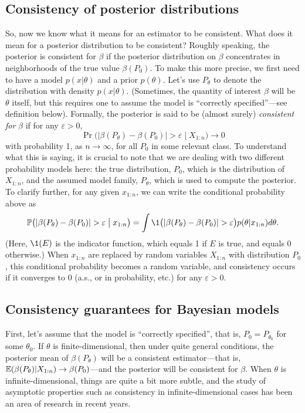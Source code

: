 \documentclass[12pt]{article}
\begin{document}
\subsection{Consistency of posterior distributions}

So, now we know what it means for an estimator to be consistent. What does it mean for a posterior distribution to be consistent? Roughly speaking, the posterior is consistent for $\beta$ if the posterior distribution on $\beta$ concentrates in neighborhoods of the true value $\beta(P_0)$.  
To make this more precise, we first need to have a model $p(x|\theta)$ and a prior $p(\theta)$. Let's use $P_\theta$ to denote the distribution with density $p(x|\theta)$. 
(Sometimes, the quantity of interest $\beta$ will be $\theta$ itself, but this requires one to assume the model is ``correctly specified''---see definition below).
Formally, the posterior is said to be (almost surely) \textit{consistent for} $\beta$ if for any $\varepsilon>0$, 
$$ \Pr\big(|\beta(P_\theta) - \beta(P_0)|>\varepsilon \; \big\vert \; X_{1:n}\big) \to 0 $$
with probability 1, as $n\to \infty$, for all $P_0$ in some relevant class. 
To understand what this is saying, it is crucial to note that we are dealing with two different probability models here: the true distribution, $P_0$, which is the distribution of $X_{1:n}$, and the assumed model family, $P_\theta$, which is used to compute the posterior. To clarify further, for any given $x_{1:n}$, we can write the conditional probability above as
$$ \Pr\big(|\beta(P_\theta) - \beta(P_0)|>\varepsilon \;\big\vert\; x_{1:n}\big) = \int \1\big(|\beta(P_\theta) - \beta(P_0)|>\varepsilon\big) p(\theta|x_{1:n}) d\theta.$$
(Here, $\1(E)$ is the indicator function, which equals 1 if $E$ is true, and equals 0 otherwise.) When $x_{1:n}$ are replaced by random variables $X_{1:n}$ with distribution $P_0$, this conditional probability becomes a random variable, and consistency occurs if it converges to $0$ (a.s., or in probability, etc.) for any $\varepsilon>0$.


\subsection{Consistency guarantees for Bayesian models}

First, let's assume that the model is ``correctly specified'', that is, $P_0 = P_{\theta_0}$ for some $\theta_0$. If $\theta$ is finite-dimensional, then under quite general conditions, the posterior mean of $\beta(P_\theta)$ will be a consistent estimator---that is, $\mathbb{E}(\beta(P_\theta) | X_{1:n}) \to \beta(P_0)$---and the posterior will be consistent for $\beta$. 
When $\theta$ is infinite-dimensional, things are quite a bit more subtle, and the study of asymptotic properties such as consistency in infinite-dimensional cases has been an area of research in recent years.
\end{document}
